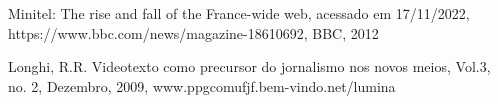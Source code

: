 \documentclass[
12pt,		%
openright,	%
twoside,  %
a4paper,			%
chapter=TITLE,		%
english,			%
french,				%
spanish,			%
brazil				%
]{USPSC-classe/USPSC}
\begin{document}
\begin{flushleft}
\begin{flushleft}
\begin{flushleft}
\begin{flushleft}
\begin{flushleft}
\begin{flushleft}
\begin{flushleft}
\begin{flushleft}
[BBC, 2012] Minitel: The rise and fall of the France-wide web, acessado em 17/11/2022, https://www.bbc.com/news/magazine-18610692, BBC, 2012
\end{flushleft}


\end{flushleft}


\end{flushleft}


\end{flushleft}


\end{flushleft}


\end{flushleft}


\end{flushleft}


\end{flushleft}


\begin{flushleft}
\begin{flushleft}
\begin{flushleft}
\begin{flushleft}
\begin{flushleft}
\begin{flushleft}
\begin{flushleft}
\begin{flushleft}
[Longhi, 2009] Longhi, R.R. Videotexto como precursor do jornalismo nos novos meios, Vol.3, no. 2, Dezembro, 2009, www.ppgcomufjf.bem-vindo.net/lumina
\end{flushleft}


\end{flushleft}


\end{flushleft}


\end{flushleft}


\end{flushleft}


\end{flushleft}


\end{flushleft}


\end{flushleft}
\end{document}
